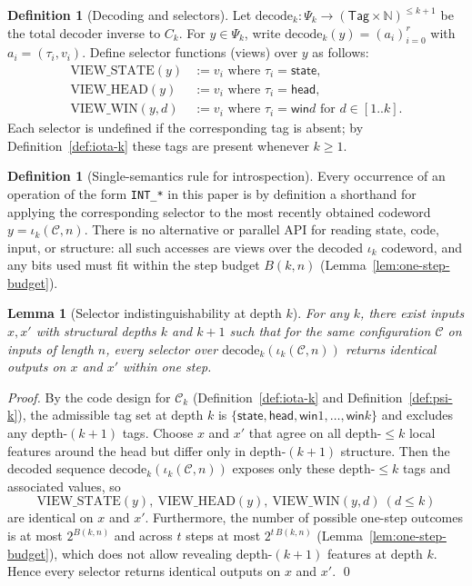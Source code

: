 \documentclass[11pt]{article}
\newtheorem{lemma}[theorem]{Lemma}
\theoremstyle{plain}
\theoremstyle{definition}
\newtheorem{definition}[theorem]{Definition}
\begin{document}
\begin{definition}[Decoding and selectors]
Let $\mathrm{decode}_k: \Psi_k \to (\mathsf{Tag}\times\mathbb{N})^{\le k+1}$ be the total decoder inverse to $C_k$. For $y\in\Psi_k$, write $\mathrm{decode}_k(y)=(a_i)_{i=0}^{r}$ with $a_i=(\tau_i,v_i)$. Define selector functions (views) over $y$ as follows:
\begin{align*}
\mathrm{VIEW\_STATE}(y) &:= v_i \text{ where } \tau_i=\textsf{state}, \\
\mathrm{VIEW\_HEAD}(y) &:= v_i \text{ where } \tau_i=\textsf{head}, \\
\mathrm{VIEW\_WIN}(y,d) &:= v_i \text{ where } \tau_i=\textsf{win}d \text{ for } d\in[1..k].
\end{align*}
Each selector is undefined if the corresponding tag is absent; by Definition~\ref{def:iota-k} these tags are present whenever $k\ge 1$.
\end{definition}

\begin{definition}[Single-semantics rule for introspection]
Every occurrence of an operation of the form \texttt{INT\_*} in this paper is by definition a shorthand for applying the corresponding selector to the most recently obtained codeword $y=\iota_k(\mathcal{C},n)$. There is no alternative or parallel API for reading state, code, input, or structure: all such accesses are views over the decoded $\iota_k$ codeword, and any bits used must fit within the step budget $B(k,n)$ (Lemma~\ref{lem:one-step-budget}).
\end{definition}

\begin{lemma}[Selector indistinguishability at depth $k$]
\label{lem:selector-indistinguishability}
For any $k$, there exist inputs $x,x'$ with structural depths $k$ and $k{+}1$ such that for the same configuration $\mathcal{C}$ on inputs of length $n$, every selector over $\mathrm{decode}_k(\iota_k(\mathcal{C},n))$ returns identical outputs on $x$ and $x'$ within one step.
\end{lemma}

\begin{proof}
By the code design for $\mathcal{C}_k$ (Definition~\ref{def:iota-k} and Definition~\ref{def:psi-k}), the admissible tag set at depth $k$ is $\{\textsf{state},\textsf{head},\textsf{win}1,\ldots,\textsf{win}k\}$ and excludes any depth-$(k{+}1)$ tags. Choose $x$ and $x'$ that agree on all depth-$\le k$ local features around the head but differ only in depth-$(k{+}1)$ structure. Then the decoded sequence $\mathrm{decode}_k(\iota_k(\mathcal{C},n))$ exposes only these depth-$\le k$ tags and associated values, so
\[\mathrm{VIEW\_STATE}(y),\ \mathrm{VIEW\_HEAD}(y),\ \mathrm{VIEW\_WIN}(y,d)~(d\le k)\]
are identical on $x$ and $x'$. Furthermore, the number of possible one-step outcomes is at most $2^{B(k,n)}$ and across $t$ steps at most $2^{t\,B(k,n)}$ (Lemma~\ref{lem:one-step-budget}), which does not allow revealing depth-$(k{+}1)$ features at depth $k$. Hence every selector returns identical outputs on $x$ and $x'$. \qed
\end{proof}
\end{document}
